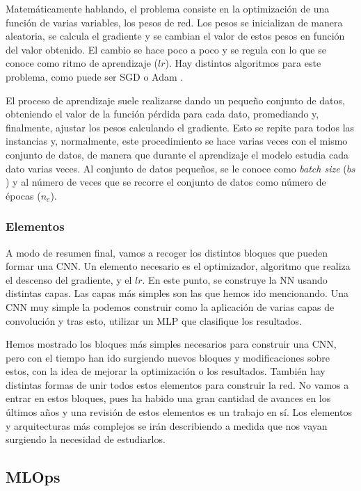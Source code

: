 \documentclass[a4paper,12pt,oneside,titlepage]{book}
\begin{document}
Matemáticamente hablando, el problema consiste en la optimización de una función de varias variables, los pesos de red. Los pesos se inicializan de manera aleatoria, se calcula el gradiente y se cambian el valor de estos pesos en función del valor obtenido. El cambio se hace poco a poco y se regula con lo que se conoce como ritmo de aprendizaje ($lr$). Hay distintos algoritmos para este problema, como puede ser SGD o Adam \cite{sgd, adam}.

El proceso de aprendizaje suele realizarse dando un pequeño conjunto de datos, obteniendo el valor de la función pérdida para cada dato, promediando y, finalmente, ajustar los pesos calculando el gradiente. Esto se repite para todos las instancias y, normalmente, este procedimiento se hace varias veces con el mismo conjunto de datos, de manera que durante el aprendizaje el modelo estudia cada dato varias veces. Al conjunto de datos pequeños, se le conoce como \textit{batch size} ($bs$) y al número de veces que se recorre el conjunto de datos como número de épocas ($n_e$).

\subsubsection*{Elementos}

A modo de resumen final, vamos a recoger los distintos bloques que pueden formar una CNN. Un elemento necesario es el optimizador, algoritmo que realiza el descenso del gradiente, y el $lr$. En este punto, se construye la NN usando distintas capas. Las capas más simples son las que hemos ido mencionando. Una CNN muy simple la podemos construir como la aplicación de varias capas de convolución y tras esto, utilizar un MLP que clasifique los resultados.

Hemos mostrado los bloques más simples necesarios para construir una CNN, pero con el tiempo han ido surgiendo nuevos bloques y modificaciones sobre estos, con la idea de mejorar la optimización o los resultados. También hay distintas formas de unir todos estos elementos para construir la red. No vamos a entrar en estos bloques, pues ha habido una gran cantidad de avances en los últimos años y una revisión de estos elementos es un trabajo en sí. Los elementos y arquitecturas más complejos se irán describiendo a medida que nos vayan surgiendo la necesidad de estudiarlos.

\subsection{MLOps}
\end{document}
